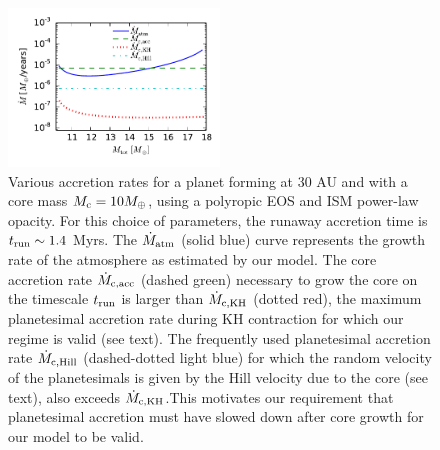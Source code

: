 

 \begin{figure}[h]
\centering
\includegraphics[width=0.5\textwidth]{figures/acc_rates_paper.pdf}
\caption{Various accretion rates for a planet forming at 30 AU and with a core mass $M_{\rm c}=10 M_{\oplus}$, using a polyropic EOS and ISM power-law opacity. For this choice of parameters, the runaway accretion time is $t_{\rm run} \sim 1.4$ Myrs. The $\dot{M}_{\rm{atm}}$ (solid blue) curve represents the growth rate of the atmosphere as estimated by our model. The core accretion rate $\dot{M}_{\rm c, acc}$ (dashed green) necessary to grow the core on the timescale $t_{\rm run}$ is larger than $\dot{M}_{\rm c, KH}$ (dotted red), the maximum planetesimal accretion rate during KH contraction for which our regime is valid (see text). The frequently used planetesimal accretion rate $\dot{M}_{\rm c, Hill}$ (dashed-dotted light blue) for which the random velocity of the planetesimals is given by the Hill velocity due to the core (see text), also exceeds $\dot{M}_{\rm c, KH}$.This motivates our requirement  that planetesimal accretion must have slowed down after core growth for our model to be valid.}

\label{fig:accrates}
\end{figure}


